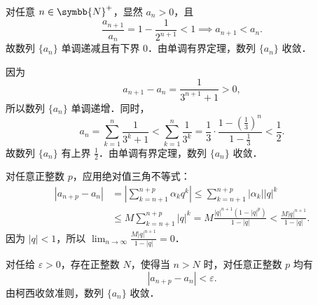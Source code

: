 \begin{myproof}

    对任意 $n \in \symbb{N}^+$，显然 $a_n > 0$，且
    \begin{equation}
        \frac{a_{n+1}}{a_n} = 1 - \frac{1}{2^{n+1}} < 1 \implies a_{n+1} < a_n.
    \end{equation}
    故数列 $\{a_n\}$ 单调递减且有下界 $0$．由单调有界定理，数列 $\{a_n\}$ 收敛．


    因为
    \begin{equation}
        a_{n+1} - a_n = \frac{1}{3^{n+1} + 1} > 0,
    \end{equation}
    所以数列 $\{a_n\}$ 单调递增．同时，
    \begin{equation}
        a_n = \sum_{k=1}^n \frac{1}{3^k + 1} < \sum_{k=1}^n \frac{1}{3^k} = \frac{1}{3} \cdot \frac{1 - \left(\frac{1}{3}\right)^n}{1 - \frac{1}{3}} < \frac{1}{2}.
    \end{equation}
    故数列 $\{a_n\}$ 有上界 $\frac{1}{2}$．由单调有界定理，数列 $\{a_n\}$ 收敛．


    对任意正整数 $p$，应用绝对值三角不等式：
    \begin{equation}
        \begin{aligned}
            |a_{n+p} - a_n| & = \left| \sum_{k=n+1}^{n+p} \alpha_k q^k \right| \leqslant \sum_{k=n+1}^{n+p} |\alpha_k| |q|^k               \\
                            & \leqslant M \sum_{k=n+1}^{n+p} |q|^k = M \frac{|q|^{n+1}(1 - |q|^p)}{1 - |q|} < \frac{M |q|^{n+1}}{1 - |q|}.
        \end{aligned}
    \end{equation}
    因为 $|q| < 1$，所以 $\lim_{n\to\infty} \frac{M |q|^{n+1}}{1 - |q|} = 0$．

    对任给 $\varepsilon > 0$，存在正整数 $N$，使得当 $n > N$ 时，对任意正整数 $p$ 均有
    \begin{equation}
        |a_{n+p} - a_n| < \varepsilon.
    \end{equation}
    由柯西收敛准则，数列 $\{a_n\}$ 收敛．



\end{myproof}
